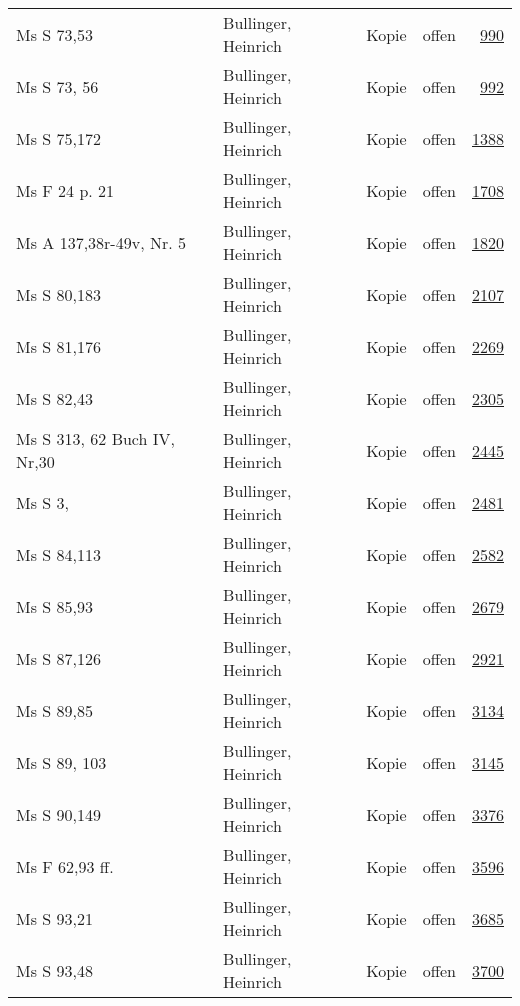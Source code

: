 \documentclass[10pt,a4paper,landscape]{report}
\begin{document}
\begin{longtable}{p{16cm}p{4cm}llr}
Ms S 73,53	&	Bullinger, Heinrich	&	Kopie	&	offen	&	\href{http://130.60.24.72/assignment/990}{990}\\
Ms S 73, 56	&	Bullinger, Heinrich	&	Kopie	&	offen	&	\href{http://130.60.24.72/assignment/992}{992}\\
Ms S 75,172	&	Bullinger, Heinrich	&	Kopie	&	offen	&	\href{http://130.60.24.72/assignment/1388}{1388}\\
Ms F 24 p. 21	&	Bullinger, Heinrich	&	Kopie	&	offen	&	\href{http://130.60.24.72/assignment/1708}{1708}\\
Ms A 137,38r-49v, Nr. 5	&	Bullinger, Heinrich	&	Kopie	&	offen	&	\href{http://130.60.24.72/assignment/1820}{1820}\\
Ms S 80,183	&	Bullinger, Heinrich	&	Kopie	&	offen	&	\href{http://130.60.24.72/assignment/2107}{2107}\\
Ms S 81,176	&	Bullinger, Heinrich	&	Kopie	&	offen	&	\href{http://130.60.24.72/assignment/2269}{2269}\\
Ms S 82,43	&	Bullinger, Heinrich	&	Kopie	&	offen	&	\href{http://130.60.24.72/assignment/2305}{2305}\\
Ms S 313, 62 Buch IV, Nr,30	&	Bullinger, Heinrich	&	Kopie	&	offen	&	\href{http://130.60.24.72/assignment/2445}{2445}\\
Ms S 3,	&	Bullinger, Heinrich	&	Kopie	&	offen	&	\href{http://130.60.24.72/assignment/2481}{2481}\\
Ms S 84,113	&	Bullinger, Heinrich	&	Kopie	&	offen	&	\href{http://130.60.24.72/assignment/2582}{2582}\\
Ms S 85,93	&	Bullinger, Heinrich	&	Kopie	&	offen	&	\href{http://130.60.24.72/assignment/2679}{2679}\\
Ms S 87,126	&	Bullinger, Heinrich	&	Kopie	&	offen	&	\href{http://130.60.24.72/assignment/2921}{2921}\\
Ms S 89,85	&	Bullinger, Heinrich	&	Kopie	&	offen	&	\href{http://130.60.24.72/assignment/3134}{3134}\\
Ms S 89, 103	&	Bullinger, Heinrich	&	Kopie	&	offen	&	\href{http://130.60.24.72/assignment/3145}{3145}\\
Ms S 90,149	&	Bullinger, Heinrich	&	Kopie	&	offen	&	\href{http://130.60.24.72/assignment/3376}{3376}\\
Ms F 62,93 ff.	&	Bullinger, Heinrich	&	Kopie	&	offen	&	\href{http://130.60.24.72/assignment/3596}{3596}\\
Ms S 93,21	&	Bullinger, Heinrich	&	Kopie	&	offen	&	\href{http://130.60.24.72/assignment/3685}{3685}\\
Ms S 93,48	&	Bullinger, Heinrich	&	Kopie	&	offen	&	\href{http://130.60.24.72/assignment/3700}{3700}\\

\end{longtable}
\end{document}

